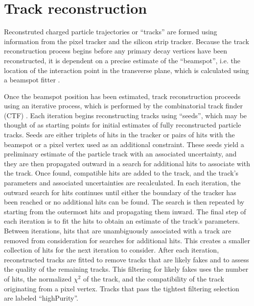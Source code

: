 \section{Track reconstruction}
\label{sec:reco-track}

Reconstruted charged particle trajectories or ``tracks''
are formed using information from the pixel tracker
and the silicon strip tracker.  Because the track reconstruction
process begins before any primary decay vertices have been 
reconstructed, it is dependent on a precise estimate of the ``beamspot'',
i.e. the location of the interaction point in the transverse plane, 
which is calculated using a beamspot fitter \cite{beamspot-fitter}.

Once the beamspot position has been estimated, track reconstruction proceeds
using an iterative process, which is performed by the combinatorial
track finder (CTF)
\cite{track-reco-2010,ctf-1,ctf-2}.
Each iteration begins reconstructing tracks using ``seeds'', 
which may be thought of as starting points for initial estimates of fully
reconstructed particle tracks.  
Seeds are either triplets of hits in the tracker or pairs of hits with 
the beamspot or a pixel vertex used as an additional constraint.  
These seeds yield a preliminary estimate of the particle track with an associated
uncertainty, and they are then propagated outward in a search for additional
hits to associate with the track.
Once found, compatible hits are added to the track, and the track's 
parameters and associated uncertainties are recalculated.
In each iteration, the outward search for hits continues until either the boundary of the tracker has been
reached or no additional hits can be found.  The search is then repeated by starting from the 
outermost hits and propagating them inward.  The final step of each iteration is to fit the hits
to obtain an estimate of the track's parameters.
Between iterations, hits that are unambiguously associated with a track
are removed from consideration for searches for additional hits.  This creates
a smaller collection of hits for the next iteration to consider.
After each iteration, reconstructed tracks are fitted to remove tracks that are likely fakes
and to assess the quality of the remaining tracks.  This filtering for likely fakes uses
the number of hits, the normalized $\chi^2$ of the track, and the compatibility of the 
track originating from a pixel vertex.  Tracks that pass the tightest filtering selection
are labeled ``highPurity''.

